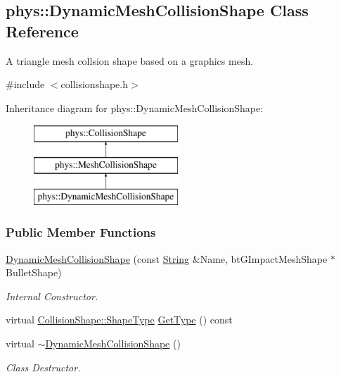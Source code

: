 \hypertarget{classphys_1_1DynamicMeshCollisionShape}{
\subsection{phys::DynamicMeshCollisionShape Class Reference}
\label{classphys_1_1DynamicMeshCollisionShape}
}


A triangle mesh collsion shape based on a graphics mesh.  




{\ttfamily \#include $<$collisionshape.h$>$}

Inheritance diagram for phys::DynamicMeshCollisionShape:\begin{figure}[H]
\begin{center}
\leavevmode
\includegraphics[height=3.000000cm]{classphys_1_1DynamicMeshCollisionShape}
\end{center}
\end{figure}
\subsubsection*{Public Member Functions}
\begin{DoxyCompactItemize}
\item 
\hyperlink{classphys_1_1DynamicMeshCollisionShape_adb9953617b68d4683deca5aa447f9c53}{DynamicMeshCollisionShape} (const \hyperlink{namespacephys_aa03900411993de7fbfec4789bc1d392e}{String} \&Name, btGImpactMeshShape $\ast$BulletShape)
\begin{DoxyCompactList}\small\item\em Internal Constructor. \item\end{DoxyCompactList}\item 
virtual \hyperlink{classphys_1_1CollisionShape_af3ba4fd8af5b9557f912d2f5ff35a588}{CollisionShape::ShapeType} \hyperlink{classphys_1_1DynamicMeshCollisionShape_a0d2d30bd1c4c0b29d276bd325a13d7ac}{GetType} () const 
\item 
\hypertarget{classphys_1_1DynamicMeshCollisionShape_af5aedecaa27a450a91afc3ea31376c4f}{
virtual \hyperlink{classphys_1_1DynamicMeshCollisionShape_af5aedecaa27a450a91afc3ea31376c4f}{$\sim$DynamicMeshCollisionShape} ()}
\label{classphys_1_1DynamicMeshCollisionShape_af5aedecaa27a450a91afc3ea31376c4f}

\begin{DoxyCompactList}\small\item\em Class Destructor. \item\end{DoxyCompactList}\end{DoxyCompactItemize}

